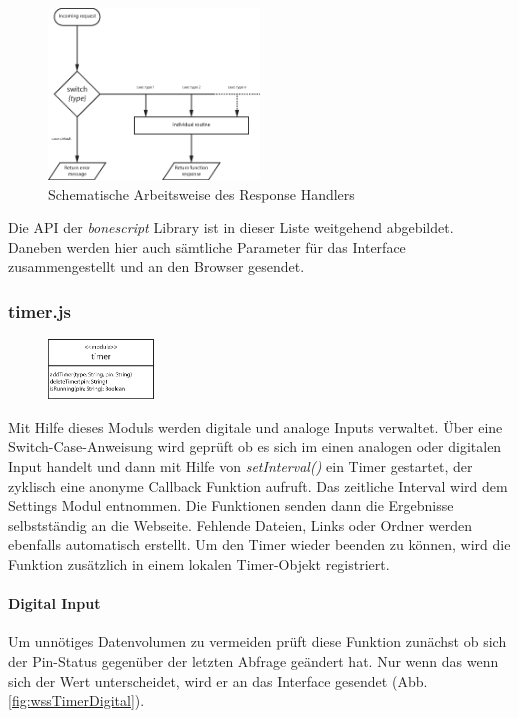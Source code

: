 \begin{figure}[ht]
  \centering
  \includegraphics[width = 0.5\textwidth]{documentation/images/wssResponseHandler.eps}
  \caption{Schematische Arbeitsweise des Response Handlers}
  \label{fig:wssResponseHandler}
\end{figure}

Die API der \textit{bonescript} Library ist in dieser Liste weitgehend abgebildet. Daneben werden hier auch sämtliche Parameter für das Interface zusammengestellt und an den Browser gesendet.

\subsubsection{timer.js}
\begin{figure}
  \vspace{-16pt}
  \centering
  \includegraphics[width = 0.25\textwidth]{documentation/images/apiTimer.eps}
\end{figure}

Mit Hilfe dieses Moduls werden digitale und analoge Inputs verwaltet. Über eine Switch-Case-Anweisung wird geprüft ob es sich im einen analogen oder digitalen Input handelt und dann mit Hilfe von \textit{setInterval()} ein Timer gestartet, der zyklisch eine anonyme Callback Funktion aufruft. Das zeitliche Interval wird dem Settings Modul entnommen. Die Funktionen senden dann die Ergebnisse selbstständig an die Webseite. Fehlende Dateien, Links oder Ordner werden ebenfalls automatisch erstellt. Um den Timer wieder beenden zu können, wird die Funktion zusätzlich in einem lokalen Timer-Objekt registriert.

\paragraph{Digital Input} Um unnötiges Datenvolumen zu vermeiden prüft diese Funktion zunächst ob sich der Pin-Status gegenüber der letzten Abfrage geändert hat. Nur wenn das wenn sich der Wert unterscheidet, wird er an das Interface gesendet (Abb. \ref{fig:wssTimerDigital}).

